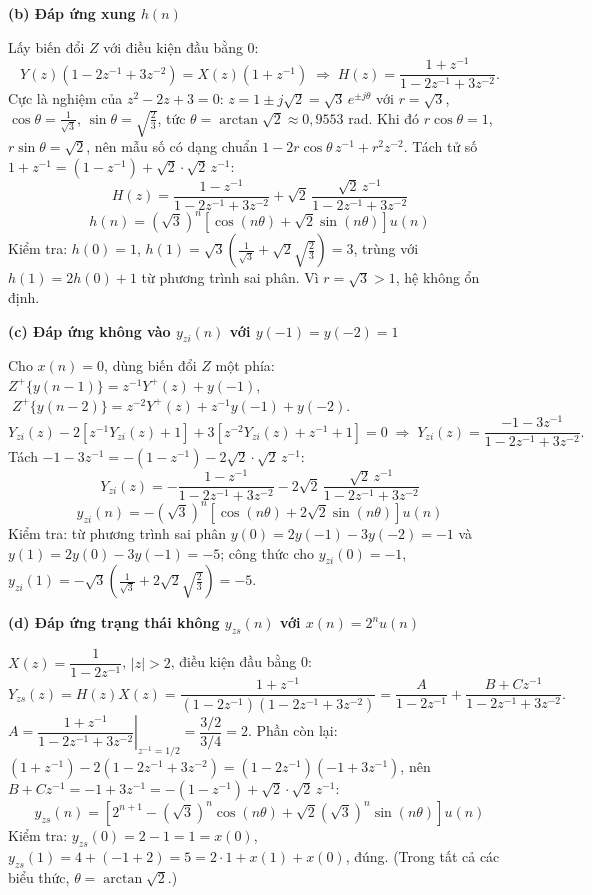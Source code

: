 \documentclass[12pt,a4paper]{article}
\begin{document}
\par\smallskip\noindent\textbf{(b) Đáp ứng xung $h(n)$}\par
Lấy biến đổi $Z$ với điều kiện đầu bằng 0:
\[
Y(z)\left(1-2z^{-1}+3z^{-2}\right)=X(z)\left(1+z^{-1}\right)\;\Rightarrow\;
H(z)=\frac{1+z^{-1}}{1-2z^{-1}+3z^{-2}}.
\]
Cực là nghiệm của $z^2-2z+3=0$: $z=1\pm j\sqrt2=\sqrt3\,e^{\pm j\theta}$ với $r=\sqrt3$, $\cos\theta=\tfrac{1}{\sqrt3}$, $\sin\theta=\sqrt{\tfrac23}$, tức $\theta=\arctan\sqrt2\approx0{,}9553$ rad. Khi đó $r\cos\theta=1$, $r\sin\theta=\sqrt2$, nên mẫu số có dạng chuẩn $1-2r\cos\theta\,z^{-1}+r^2z^{-2}$. Tách tử số $1+z^{-1}=(1-z^{-1})+\sqrt2\cdot\sqrt2\,z^{-1}$:
\[
H(z)=\frac{1-z^{-1}}{1-2z^{-1}+3z^{-2}}+\sqrt2\,\frac{\sqrt2\,z^{-1}}{1-2z^{-1}+3z^{-2}}
\]
\[
\boxed{\,h(n)=\left(\sqrt3\right)^n\left[\cos(n\theta)+\sqrt2\sin(n\theta)\right]u(n)\,}
\]
Kiểm tra: $h(0)=1$, $h(1)=\sqrt3\left(\tfrac{1}{\sqrt3}+\sqrt2\sqrt{\tfrac23}\right)=3$, trùng với $h(1)=2h(0)+1$ từ phương trình sai phân. Vì $r=\sqrt3>1$, hệ không ổn định.

\par\smallskip\noindent\textbf{(c) Đáp ứng không vào $y_{zi}(n)$ với $y(-1)=y(-2)=1$}\par
Cho $x(n)=0$, dùng biến đổi $Z$ một phía:
$Z^{+}\{y(n-1)\}=z^{-1}Y^{+}(z)+y(-1)$, $\;Z^{+}\{y(n-2)\}=z^{-2}Y^{+}(z)+z^{-1}y(-1)+y(-2)$.
\[
Y_{zi}(z)-2\left[z^{-1}Y_{zi}(z)+1\right]+3\left[z^{-2}Y_{zi}(z)+z^{-1}+1\right]=0
\;\Rightarrow\;
Y_{zi}(z)=\frac{-1-3z^{-1}}{1-2z^{-1}+3z^{-2}}.
\]
Tách $-1-3z^{-1}=-(1-z^{-1})-2\sqrt2\cdot\sqrt2\,z^{-1}$:
\[
Y_{zi}(z)=-\frac{1-z^{-1}}{1-2z^{-1}+3z^{-2}}-2\sqrt2\,\frac{\sqrt2\,z^{-1}}{1-2z^{-1}+3z^{-2}}
\]
\[
\boxed{\,y_{zi}(n)=-\left(\sqrt3\right)^n\left[\cos(n\theta)+2\sqrt2\sin(n\theta)\right]u(n)\,}
\]
Kiểm tra: từ phương trình sai phân $y(0)=2y(-1)-3y(-2)=-1$ và $y(1)=2y(0)-3y(-1)=-5$; công thức cho $y_{zi}(0)=-1$, $y_{zi}(1)=-\sqrt3\left(\tfrac{1}{\sqrt3}+2\sqrt2\sqrt{\tfrac23}\right)=-5$.

\par\smallskip\noindent\textbf{(d) Đáp ứng trạng thái không $y_{zs}(n)$ với $x(n)=2^nu(n)$}\par
$X(z)=\dfrac{1}{1-2z^{-1}}$, $|z|>2$, điều kiện đầu bằng 0:
\[
Y_{zs}(z)=H(z)X(z)=\frac{1+z^{-1}}{(1-2z^{-1})(1-2z^{-1}+3z^{-2})}=\frac{A}{1-2z^{-1}}+\frac{B+Cz^{-1}}{1-2z^{-1}+3z^{-2}}.
\]
$A=\left.\dfrac{1+z^{-1}}{1-2z^{-1}+3z^{-2}}\right|_{z^{-1}=1/2}=\dfrac{3/2}{3/4}=2$. Phần còn lại: $(1+z^{-1})-2(1-2z^{-1}+3z^{-2})=(1-2z^{-1})(-1+3z^{-1})$, nên $B+Cz^{-1}=-1+3z^{-1}=-(1-z^{-1})+\sqrt2\cdot\sqrt2\,z^{-1}$:
\[
\boxed{\,y_{zs}(n)=\left[2^{n+1}-\left(\sqrt3\right)^n\cos(n\theta)+\sqrt2\left(\sqrt3\right)^n\sin(n\theta)\right]u(n)\,}
\]
Kiểm tra: $y_{zs}(0)=2-1=1=x(0)$, $y_{zs}(1)=4+(-1+2)=5=2\cdot1+x(1)+x(0)$, đúng. (Trong tất cả các biểu thức, $\theta=\arctan\sqrt2$.)
\end{document}
